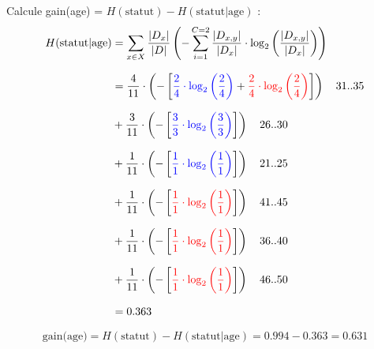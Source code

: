 \documentclass{article}
\begin{document}
Calcule gain(age) = $H(\text{statut}) - H(\text{statut} | \text{age})$ :
\begin{align*}
    H(\text{statut} | \text{age}) &= \sum_{x\in X} \dfrac{|D_x|}{|D|} \left( - \sum_{i=1} ^{C=2} \dfrac{|D_{x,y}|}{|D_x|} \cdot \log_2 \left( \dfrac{|D_{x,y}|}{|D_x|} \right) \right)\\[0.25cm]
                                  &= \dfrac{4}{11} \cdot \left( - \left[ \textcolor{blue}{\dfrac{2}{4} \cdot \log_2\left (\dfrac{2}{4} \right)} +   \textcolor{red}{\dfrac{2}{4} \cdot \log_2\left (\dfrac{2}{4} \right)} \right]  \right) \quad \text{31..35}\\[0.25cm]
                                  &+ \dfrac{3}{11} \cdot \left( - \left[ \textcolor{blue}{\dfrac{3}{3} \cdot \log_2\left (\dfrac{3}{3} \right)} \right]  \right) \quad \text{26..30}\\[0.25cm]
                                  &+ \dfrac{1}{11} \cdot \left( - \left[ \textcolor{blue}{\dfrac{1}{1} \cdot \log_2\left (\dfrac{1}{1} \right)}  \right]  \right) \quad \text{21..25}\\[0.25cm]
                                  &+ \dfrac{1}{11} \cdot \left( - \left[ \textcolor{red}{\dfrac{1}{1} \cdot \log_2\left (\dfrac{1}{1} \right)}  \right]  \right) \quad \text{41..45}\\[0.25cm]
                                  &+ \dfrac{1}{11} \cdot \left( - \left[ \textcolor{red}{\dfrac{1}{1} \cdot \log_2\left (\dfrac{1}{1} \right)}  \right]  \right) \quad \text{36..40}\\[0.25cm]
                                  &+ \dfrac{1}{11} \cdot \left( - \left[ \textcolor{red}{\dfrac{1}{1} \cdot \log_2\left (\dfrac{1}{1} \right)}  \right]  \right) \quad \text{46..50}\\[0.25cm]
                                  & = 0.363
\end{align*}


\vspace{-0.15cm}

\[\text{gain(age)} = H(\text{statut}) - H(\text{statut} | \text{age}) = 0.994 - 0.363 = 0.631\]

\vspace{0.45cm}
\end{document}
